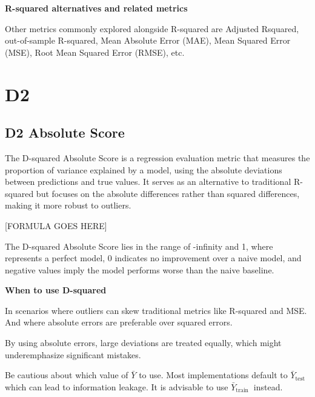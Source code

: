 \textbf{R-squared alternatives and related metrics}

Other metrics commonly explored alongside R-squared are Adjusted Rsquared, out-of-sample R-squared,
Mean Absolute Error (MAE), Mean Squared Error (MSE), Root Mean Squared Error (RMSE), etc.



\clearpage
\thispagestyle{regressionstyle}
\section{D2}
\subsection{D2 Absolute Score}

The D-squared Absolute Score is a regression evaluation metric that measures the proportion of variance explained by a model, using the absolute deviations between predictions and true values. 
It serves as an alternative to traditional R-squared but focuses on the absolute differences rather than squared differences, making it more robust to outliers.

\begin{center}
    [FORMULA GOES HERE]
\end{center}

The D-squared Absolute Score lies in the range of -infinity and 1, where represents a perfect model, 0 indicates no improvement over a naive model,
and negative values imply the model performs worse than the naive baseline.

\textbf{When to use D-squared}

In scenarios where outliers can skew traditional metrics like R-squared and MSE. And where absolute errors are preferable over squared errors.

{
    \item By using absolute errors, large deviations are treated equally, which might underemphasize significant mistakes.
    \item Be cautious about which value of $\bar{Y}$ to use. Most implementations default to $\bar{Y}_{\text {test }}$ which can lead to information leakage. It is advisable to use $\bar{Y}_{\text {train }}$ instead.
}


